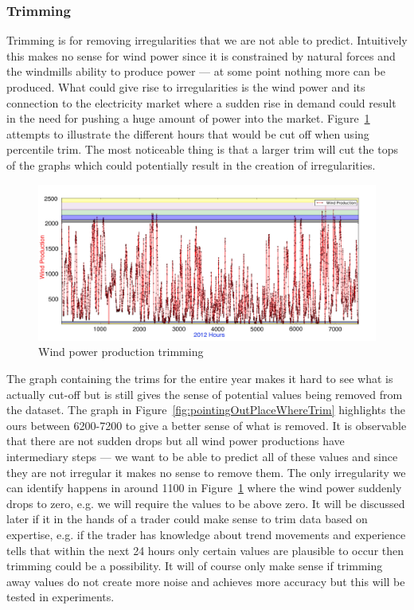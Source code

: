 \subsubsection{Trimming} 
Trimming is for removing irregularities that we are not able to predict. Intuitively this makes no sense for wind power since it is constrained by natural forces and the windmills ability to produce power --- at some point nothing more can be produced. What could give rise to irregularities is the wind power and its connection to the electricity market where a sudden rise in demand could result in the need for pushing a huge amount of power into the market. Figure~\ref{fig:windProductionTrimming} attempts to illustrate the different hours that would be cut off when using percentile trim. The most noticeable thing is that a larger trim will cut the tops of the graphs which could potentially result in the creation of irregularities. 

\begin{figure}[H]
\centering
\includegraphics[width=0.99\linewidth,natwidth=898,natheight=587]{billeder/windProductionTrimming.jpg}
\caption{Wind power production trimming}
\label{fig:windProductionTrimming}
\end{figure}

The graph containing the trims for the entire year makes it hard to see what is actually cut-off but is still gives the sense of potential values being removed from the dataset. The graph in Figure~\ref{fig:pointingOutPlaceWhereTrim} highlights the ours between 6200-7200 to give a better sense of what is removed. It is observable that there are not sudden drops but all wind power productions have intermediary steps --- we want to be able to predict all of these values and since they are not irregular it makes no sense to remove them. The only irregularity we can identify happens in around 1100 in Figure~\ref{fig:windProductionTrimming} where the wind power suddenly drops to zero, e.g. we will require the values to be above zero. It will be discussed later if it in the hands of a trader could make sense to trim data based on expertise, e.g. if the trader has knowledge about trend movements and experience tells that within the next 24 hours only certain values are plausible to occur then trimming could be a possibility. It will of course only make sense if trimming away values do not create more noise and achieves more accuracy but this will be tested in experiments.

